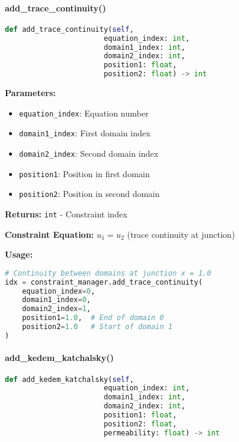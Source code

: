 \paragraph{add\_trace\_continuity()}\leavevmode
\begin{lstlisting}[language=Python, caption=Add Trace Continuity Method]
def add_trace_continuity(self, 
                       equation_index: int,
                       domain1_index: int, 
                       domain2_index: int,
                       position1: float, 
                       position2: float) -> int
\end{lstlisting}

\textbf{Parameters:}
\begin{itemize}
    \item \texttt{equation\_index}: Equation number
    \item \texttt{domain1\_index}: First domain index
    \item \texttt{domain2\_index}: Second domain index
    \item \texttt{position1}: Position in first domain
    \item \texttt{position2}: Position in second domain
\end{itemize}

\textbf{Returns:} \texttt{int} - Constraint index

\textbf{Constraint Equation:} $u_1 = u_2$ (trace continuity at junction)

\textbf{Usage:}
\begin{lstlisting}[language=Python, caption=Add Trace Continuity Usage]
# Continuity between domains at junction x = 1.0
idx = constraint_manager.add_trace_continuity(
    equation_index=0,
    domain1_index=0,
    domain2_index=1,
    position1=1.0,  # End of domain 0
    position2=1.0   # Start of domain 1
)
\end{lstlisting}

\paragraph{add\_kedem\_katchalsky()}\leavevmode
\begin{lstlisting}[language=Python, caption=Add Kedem-Katchalsky Method]
def add_kedem_katchalsky(self, 
                       equation_index: int,
                       domain1_index: int, 
                       domain2_index: int,
                       position1: float, 
                       position2: float,
                       permeability: float) -> int
\end{lstlisting}

